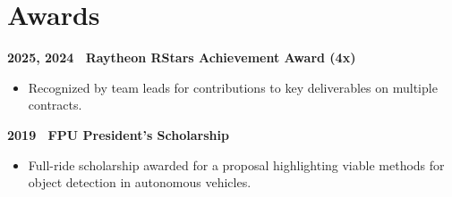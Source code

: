 \section{Awards}

\textbf{2025, 2024 \textbar\ Raytheon RStars Achievement Award (4x)}

\begin{itemize}
  \item Recognized by team leads for contributions to key deliverables on multiple contracts.
\end{itemize}

\textbf{2019 \textbar\ FPU President's Scholarship}

\begin{itemize}
  \item Full-ride scholarship awarded for a proposal highlighting viable methods for object detection in autonomous vehicles.
\end{itemize}

